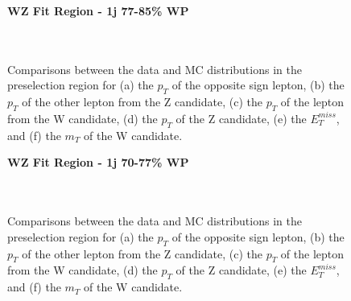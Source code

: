 \begin{figure}[H]
    \centering
    \textbf{WZ Fit Region - 1j 77-85\% WP}\\
    \\
    \\
    \caption{Comparisons between the data and MC distributions in the preselection region for (a) the $p_T$ of the opposite sign lepton, (b) the $p_T$ of the other lepton from the Z candidate, (c) the $p_T$ of the lepton from the W candidate, (d) the $p_T$ of the Z candidate, (e) the $E_T^{miss}$, and (f) the $m_T$ of the W candidate.}
    \label{kin:WP_1j_77_85}
\end{figure}

\begin{figure}[H]
    \centering
    \textbf{WZ Fit Region - 1j 70-77\% WP}\\
    \\
    \\
    \caption{Comparisons between the data and MC distributions in the preselection region for (a) the $p_T$ of the opposite sign lepton, (b) the $p_T$ of the other lepton from the Z candidate, (c) the $p_T$ of the lepton from the W candidate, (d) the $p_T$ of the Z candidate, (e) the $E_T^{miss}$, and (f) the $m_T$ of the W candidate.}
    \label{kin:WP_1j_70_77}   
\end{figure}

